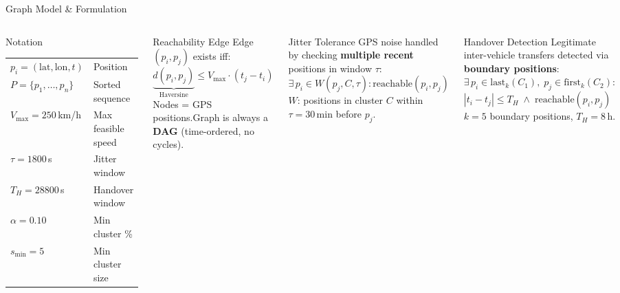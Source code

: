 \documentclass[aspectratio=169,xcolor=dvipsnames,9pt]{beamer}
\begin{document}
\begin{frame}{Graph Model \& Formulation}
    \vspace*{-0.5em}
    \begin{columns}[T]
        \begin{block}{Notation}
            \footnotesize
            \begin{tabular}{ll}
                $p_i = (\text{lat}, \text{lon}, t)$ & Position \\
                $P = \{p_1, \ldots, p_n\}$ & Sorted sequence \\
                $V_{\max} = 250$\,km/h & Max feasible speed \\
                $\tau = 1800$\,s & Jitter window \\
                $T_H = 28800$\,s & Handover window \\
                $\alpha = 0.10$ & Min cluster \% \\
                $s_{\min} = 5$ & Min cluster size \\
            \end{tabular}
        \end{block}

        \vspace{0.2em}
        \begin{block}{Reachability Edge}
            \footnotesize
            Edge $(p_i, p_j)$ exists iff:
            \[
            \underbrace{d(p_i,p_j)}_{\text{Haversine}} \leq V_{\max} \cdot (t_j - t_i)
            \]
            Nodes = GPS positions.\quad Graph is always a \textbf{DAG} (time-ordered, no cycles).
        \end{block}

        \begin{block}{Jitter Tolerance}
            \footnotesize
            GPS noise handled by checking \textbf{multiple recent} positions in window $\tau$:
            $\exists\, p_i \in W(p_j, C, \tau) : \mathrm{reachable}(p_i, p_j)$\\
            $W$: positions in cluster $C$ within $\tau = 30$\,min before $p_j$.
        \end{block}

        \vspace{0.2em}
        \begin{block}{Handover Detection}
            \footnotesize
            Legitimate inter-vehicle transfers detected via \textbf{boundary positions}:\\
            $\exists\, p_i \in \mathrm{last}_k(C_1),\; p_j \in \mathrm{first}_k(C_2) :$
            $|t_i - t_j| \leq T_H \;\wedge\; \mathrm{reachable}(p_i, p_j)$\\
            $k = 5$ boundary positions, $T_H = 8$\,h.
        \end{block}


\end{columns}
\end{frame}
\end{document}
